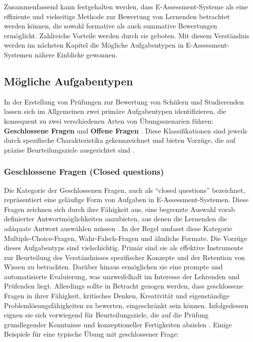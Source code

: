 Zusammenfassend kann festgehalten werden, dass E-Assessment-Systeme als eine effiziente und vielseitige Methode zur Bewertung von Lernenden betrachtet werden können, die sowohl formative als auch summative Bewertungen ermöglicht. Zahlreiche Vorteile werden durch sie geboten. Mit diesem Verständnis werden im nächsten Kapitel die Mögliche Aufgabentypen in E-Assessment-Systemen nähere Einblicke gewonnen.

\subsection{Mögliche Aufgabentypen}

In der Erstellung von Prüfungen zur Bewertung von Schülern und Studierenden lassen sich im Allgemeinen zwei primäre Aufgabentypen identifizieren, die konsequent zu zwei verschiedenen Arten von Übungsszenarien führen: \textbf{Geschlossene Fragen} und \textbf{Offene Fragen} \cite{review-e}. Diese Klassifikationen sind jeweils durch spezifische Charakteristika gekennzeichnet und bieten Vorzüge, die auf präzise Beurteilungsziele ausgerichtet sind \cite{kocdar2018cheating}.

\subsubsection{\gls{Geschlossene Fragen} (Closed questions)}

Die Kategorie der Geschlossenen Fragen, auch als ``closed questions'' bezeichnet, repräsentiert eine geläufige Form von Aufgaben in E-Assessment-Systemen. Diese Fragen zeichnen sich durch ihre Fähigkeit aus, eine begrenzte Auswahl vorab definierter Antwortmöglichkeiten anzubieten, aus denen die Lernenden die adäquate Antwort auswählen müssen \cite{gruttmann2009formatives}. In der Regel umfasst diese Kategorie Multiple-Choice-Fragen, Wahr-Falsch-Fragen und ähnliche Formate. Die Vorzüge dieses Aufgabentyps sind vielschichtig. Primär sind sie als effektive Instrumente zur Beurteilung des Verständnisses spezifischer Konzepte und der Retention von Wissen zu betrachten. Darüber hinaus ermöglichen sie eine prompte und automatisierte Evaluierung, was unzweifelhaft im Interesse der Lehrenden und Prüfenden liegt. Allerdings sollte in Betracht gezogen werden, dass geschlossene Fragen in ihrer Fähigkeit, kritisches Denken, Kreativität und eigenständige Problemlösungsfähigkeiten zu bewerten, eingeschränkt sein können. Infolgedessen eignen sie sich vorwiegend für Beurteilungsziele, die auf die Prüfung grundlegender Kenntnisse und konzeptioneller Fertigkeiten abzielen \cite{gruttmann2009formatives}. Einige Beispiele für eine typische Übung mit geschlossener Frage:

